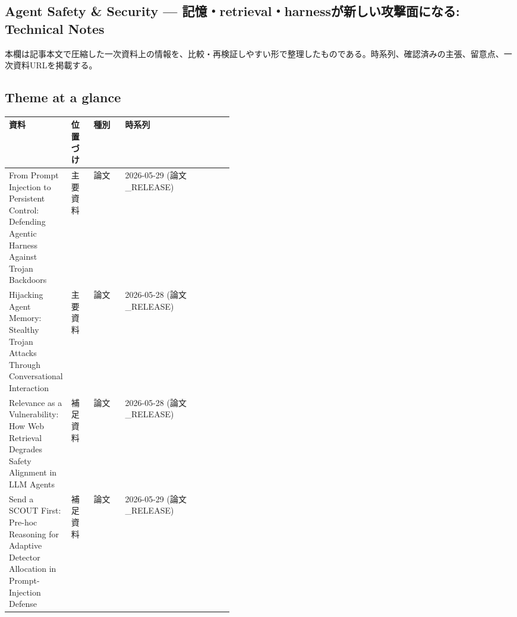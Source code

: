 \subsection*{Agent Safety \& Security — 記憶・retrieval・harnessが新しい攻撃面になる: Technical Notes}
本欄は記事本文で圧縮した一次資料上の情報を、比較・再検証しやすい形で整理したものである。時系列、確認済みの主張、留意点、一次資料URLを掲載する。
\medskip
\subsection*{Theme at a glance}
\begin{center}
\footnotesize
\begin{tabularx}{\linewidth}{@{}p{0.20\linewidth}p{0.10\linewidth}p{0.14\linewidth}X@{}}
\toprule
資料 & 位置づけ & 種別 & 時系列 \\
\midrule
From Prompt Injection to Persistent Control: Defending Agentic Harness Against Trojan Backdoors & 主要資料 & 論文 & 2026-05-29 (論文\_RELEASE) \\
Hijacking Agent Memory: Stealthy Trojan Attacks Through Conversational Interaction & 主要資料 & 論文 & 2026-05-28 (論文\_RELEASE) \\
Relevance as a Vulnerability: How Web Retrieval Degrades Safety Alignment in LLM Agents & 補足資料 & 論文 & 2026-05-28 (論文\_RELEASE) \\
Send a SCOUT First: Pre-hoc Reasoning for Adaptive Detector Allocation in Prompt-Injection Defense & 補足資料 & 論文 & 2026-05-29 (論文\_RELEASE) \\
\bottomrule
\end{tabularx}
\end{center}
\normalsize

